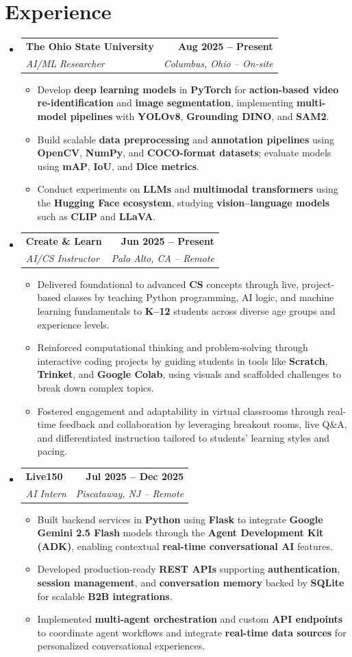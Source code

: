 \documentclass[letterpaper,11pt]{article}
\makeatletter
\newcommand{\resumeItem}[1]{
  \item\small{
    {#1 \vspace{0pt}}
  }
}
\newcommand{\resumeSubheading}[4]{
  \vspace{-2pt}\item
    \begin{tabular*}{1.0\textwidth}[t]{l@{\extracolsep{\fill}}r}
      \textbf{#1} & \textbf{\small #2} \\
      \textit{\small#3} & \textit{\small #4} \\
    \end{tabular*}\vspace{-7pt}
}
\newcommand{\resumeSubHeadingListStart}{\begin{itemize}[leftmargin=0.0in, label={}]}
\newcommand{\resumeSubHeadingListEnd}{\end{itemize}}\vspace{0pt}
\newcommand{\resumeItemListStart}{\begin{itemize}}
\newcommand{\resumeItemListEnd}{\end{itemize}\vspace{-5pt}}
\makeatother
\begin{document}
\section{Experience}
    \resumeSubHeadingListStart
                \resumeSubheading{The Ohio State University}{Aug 2025 -- Present}{AI/ML Researcher}{Columbus, Ohio -- On-site}
                \resumeItemListStart
  \resumeItem{Develop \textbf{deep learning models} in \textbf{PyTorch} for \textbf{action-based video re-identification} and \textbf{image segmentation}, implementing \textbf{multi-model pipelines} with \textbf{YOLOv8}, \textbf{Grounding DINO}, and \textbf{SAM2}.}
  \resumeItem{Build scalable \textbf{data preprocessing} and \textbf{annotation pipelines} using \textbf{OpenCV}, \textbf{NumPy}, and \textbf{COCO-format datasets}; evaluate models using \textbf{mAP}, \textbf{IoU}, and \textbf{Dice metrics}.}
  \resumeItem{Conduct experiments on \textbf{LLMs} and \textbf{multimodal transformers} using the \textbf{Hugging Face ecosystem}, studying \textbf{vision–language models} such as \textbf{CLIP} and \textbf{LLaVA}.}
\resumeItemListEnd
                \resumeSubheading{Create \& Learn}{Jun 2025 -- Present}{AI/CS Instructor}{Palo Alto, CA -- Remote} 
\resumeItemListStart
    \resumeItem{Delivered foundational to advanced \textbf{CS} concepts through live, project-based classes by teaching Python programming, AI logic, and machine learning fundamentals to \textbf{K--12} students across diverse age groups and experience levels.}
    \resumeItem{Reinforced computational thinking and problem-solving through interactive coding projects by guiding students in tools like \textbf{Scratch}, \textbf{Trinket}, and \textbf{Google Colab}, using visuals and scaffolded challenges to break down complex topics.}
    \resumeItem{Fostered engagement and adaptability in virtual classrooms through real-time feedback and collaboration by leveraging breakout rooms, live Q\&A, and differentiated instruction tailored to students' learning styles and pacing.}
\resumeItemListEnd

\resumeSubheading{Live150}{Jul 2025 -- Dec 2025}{AI Intern}{Piscataway, NJ -- Remote}
\resumeItemListStart
  \resumeItem{Built backend services in \textbf{Python} using \textbf{Flask} to integrate \textbf{Google Gemini 2.5 Flash} models through the \textbf{Agent Development Kit (ADK)}, enabling contextual \textbf{real-time conversational AI} features.}
  \resumeItem{Developed production-ready \textbf{REST APIs} supporting \textbf{authentication}, \textbf{session management}, and \textbf{conversation memory} backed by \textbf{SQLite} for scalable \textbf{B2B integrations}.}
  \resumeItem{Implemented \textbf{multi-agent orchestration} and custom \textbf{API endpoints} to coordinate agent workflows and integrate \textbf{real-time data sources} for personalized conversational experiences.}
\resumeItemListEnd
    \resumeSubHeadingListEnd
    \vspace{-12pt}
\end{document}
